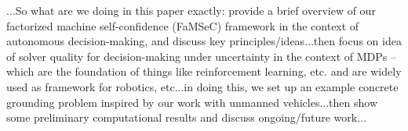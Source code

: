 ...So what are we doing in this paper exactly: provide a brief overview of our factorized machine self-confidence (FaMSeC) framework in the context of autonomous decision-making, and discuss key principles/ideas...then focus on idea of solver quality for decision-making under uncertainty in the context of MDPs -- which are the foundation of things like reinforcement learning, etc. and are widely used as framework for robotics, etc...in doing this, we set up an example concrete grounding problem inspired by our work with unmanned vehicles...then show some preliminary computational results and discuss ongoing/future work...



